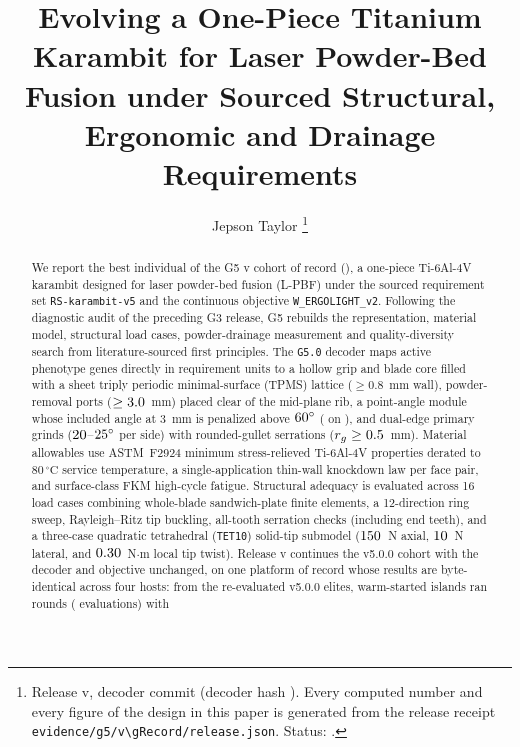 \documentclass[10pt,journal,letterpaper]{IEEEtran}
\DeclareRobustCommand{\code}[1]{\texorpdfstring{{\nolinkurl{#1}}}{#1}}
\begin{document}
\title{Evolving a One-Piece Titanium Karambit for Laser Powder-Bed Fusion under Sourced Structural, Ergonomic and Drainage Requirements}
\author{Jepson Taylor%
\thanks{Release v\gVersion, decoder commit \gCommit{} (decoder hash \gDecoder). Every computed number and every figure of the design in this
paper is generated from the release receipt \code{evidence/g5/v\gRecord/release.json}. Status: \gStatus.}}
\maketitle

\begin{abstract}
We report the best individual of the G5 v\gRecord{} cohort of record (\gDesign), a one-piece Ti-6Al-4V karambit designed for laser
powder-bed fusion (L-PBF) under the sourced requirement set \code{RS-karambit-v5} and the continuous objective
\code{W\_ERGOLIGHT\_v2}. Following the diagnostic audit of the preceding G3 release, G5 rebuilds the representation,
material model, structural load cases, powder-drainage measurement and quality-diversity search from literature-sourced
first principles. The \code{G5.0} decoder maps \gGeneCount{} active phenotype genes directly in requirement units to a hollow grip and
blade core filled with a sheet triply periodic minimal-surface (TPMS) lattice ($\ge 0.8$~mm wall), powder-removal ports ($\ge 3.0$~mm)
placed clear of the mid-plane rib, a point-angle module whose included angle at 3~mm is penalized above $60^\circ$
(\gPointAngleThree\textdegree{} on \gDesign), and dual-edge primary grinds
($20$--$25^\circ$ per side) with rounded-gullet serrations ($r_g \ge 0.5$~mm). Material allowables use ASTM~F2924 minimum
stress-relieved Ti-6Al-4V properties derated to $80\,^\circ\mathrm{C}$ service temperature, a single-application thin-wall knockdown
law per face pair, and surface-class FKM high-cycle fatigue. Structural adequacy is evaluated across 16 load cases combining
whole-blade sandwich-plate finite elements, a 12-direction ring sweep, Rayleigh--Ritz tip buckling, all-tooth
serration checks (including end teeth), and a three-case quadratic tetrahedral (\code{TET10}) solid-tip submodel ($150$~N axial,
$10$~N lateral, and $0.30$~N$\cdot$m local tip twist). Release v\gRecord{} continues the v5.0.0 cohort with the
decoder and objective unchanged, on one platform of record whose results are byte-identical across four hosts: from the
\gVFiveElites{} re-evaluated v5.0.0 elites, \gIslands{} warm-started islands ran \gRounds{} rounds (\gEvalsTotal{} evaluations) with

\end{abstract}
\end{document}
